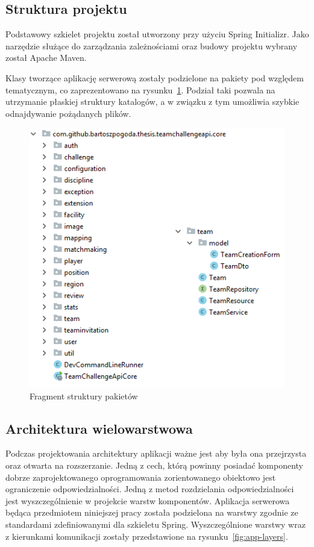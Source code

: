 \subsection{Struktura projektu}

Podstawowy szkielet projektu został utworzony przy użyciu Spring Initializr. Jako narzędzie służące do zarządzania zależnościami oraz budowy projektu wybrany został Apache Maven. 

  Klasy tworzące aplikację serwerową zostały podzielone na pakiety pod względem tematycznym, co zaprezentowano na rysunku~\ref{fig:packages}. Podział taki pozwala na utrzymanie płaskiej struktury katalogów, a w związku z tym umożliwia szybkie odnajdywanie pożądanych plików.
  
  
\begin{figure}[ht]
\centering
\includegraphics[width=0.5\linewidth]{06-implementacja/rys/package-team.PNG}
\caption{Fragment struktury pakietów}
\label{fig:packages}
\end{figure}

\subsection{Architektura wielowarstwowa}

Podczas projektowania architektury aplikacji ważne jest aby była ona przejrzysta oraz otwarta na rozszerzanie. Jedną z cech, którą powinny posiadać komponenty dobrze zaprojektowanego oprogramowania zorientowanego obiektowo jest ograniczenie odpowiedzialności. Jedną z metod rozdzielania odpowiedzialności jest wyszczególnienie w projekcie warstw komponentów. Aplikacja serwerowa będąca przedmiotem niniejszej pracy została podzielona na warstwy zgodnie ze standardami zdefiniowanymi dla szkieletu Spring. Wyszczególnione warstwy wraz z kierunkami komunikacji zostały przedstawione na rysunku~\ref{fig:app-layers}.



